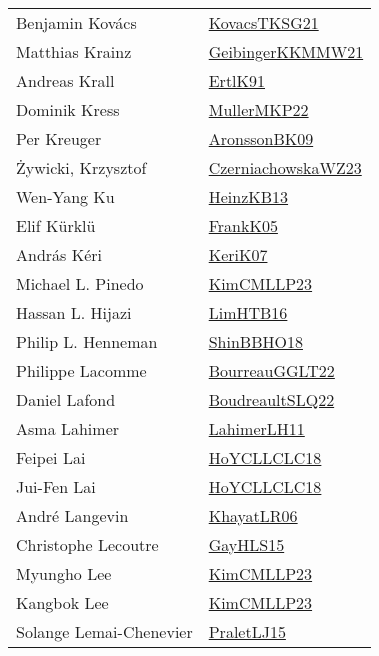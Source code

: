 {\begin{longtable}{p{4cm}p{20cm}}
Benjamin Kov{\'{a}}cs & \href{papers/KovacsTKSG21.pdf}{KovacsTKSG21}\cite{KovacsTKSG21} \\
Matthias Krainz & \href{papers/GeibingerKKMMW21.pdf}{GeibingerKKMMW21}\cite{GeibingerKKMMW21} \\
Andreas Krall & \href{papers/ErtlK91.pdf}{ErtlK91}\cite{ErtlK91} \\
Dominik Kress & \href{articles/MullerMKP22.pdf}{MullerMKP22}\cite{MullerMKP22} \\
Per Kreuger & \href{papers/AronssonBK09.pdf}{AronssonBK09}\cite{AronssonBK09} \\
Żywicki, Krzysztof & \href{articles/CzerniachowskaWZ23.pdf}{CzerniachowskaWZ23}\cite{CzerniachowskaWZ23} \\
Wen{-}Yang Ku & \href{papers/HeinzKB13.pdf}{HeinzKB13}\cite{HeinzKB13} \\
Elif K{\"{u}}rkl{\"{u}} & \href{papers/FrankK05.pdf}{FrankK05}\cite{FrankK05} \\
Andr{\'{a}}s K{\'{e}}ri & \href{papers/KeriK07.pdf}{KeriK07}\cite{KeriK07} \\
Michael L. Pinedo & \href{papers/KimCMLLP23.pdf}{KimCMLLP23}\cite{KimCMLLP23} \\
Hassan L. Hijazi & \href{papers/LimHTB16.pdf}{LimHTB16}\cite{LimHTB16} \\
Philip L. Henneman & \href{articles/ShinBBHO18.pdf}{ShinBBHO18}\cite{ShinBBHO18} \\
Philippe Lacomme & \href{articles/BourreauGGLT22.pdf}{BourreauGGLT22}\cite{BourreauGGLT22} \\
Daniel Lafond & \href{papers/BoudreaultSLQ22.pdf}{BoudreaultSLQ22}\cite{BoudreaultSLQ22} \\
Asma Lahimer & \href{papers/LahimerLH11.pdf}{LahimerLH11}\cite{LahimerLH11} \\
Feipei Lai & \href{papers/HoYCLLCLC18.pdf}{HoYCLLCLC18}\cite{HoYCLLCLC18} \\
Jui{-}Fen Lai & \href{papers/HoYCLLCLC18.pdf}{HoYCLLCLC18}\cite{HoYCLLCLC18} \\
Andr{\'{e}} Langevin & \href{articles/KhayatLR06.pdf}{KhayatLR06}\cite{KhayatLR06} \\
Christophe Lecoutre & \href{papers/GayHLS15.pdf}{GayHLS15}\cite{GayHLS15} \\
Myungho Lee & \href{papers/KimCMLLP23.pdf}{KimCMLLP23}\cite{KimCMLLP23} \\
Kangbok Lee & \href{papers/KimCMLLP23.pdf}{KimCMLLP23}\cite{KimCMLLP23} \\
Solange Lemai{-}Chenevier & \href{papers/PraletLJ15.pdf}{PraletLJ15}\cite{PraletLJ15} \\

\end{longtable}}
